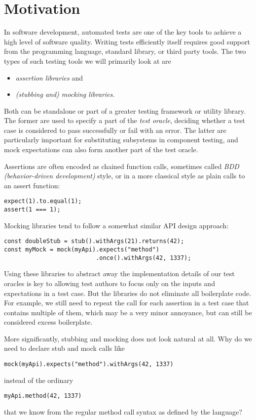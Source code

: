 \section{Motivation}
In software development, automated tests are one of the key tools
to achieve a high level of software quality.
Writing tests efficiently itself requires good support
from the programming language, standard library, or third party tools.
The two types of such testing tools we will primarily look at are
\begin{itemize}
  \item \textit{assertion libraries} and
  \item \textit{(stubbing and) mocking libraries}.
\end{itemize}
Both can be standalone or part of a greater testing framework or utility library.
The former are used to specify a part of the \textit{test oracle},
deciding whether a test case is considered to pass successfully or fail with an error.
The latter are particularly important for substituting subsystems in component testing,
and mock expectations can also form another part of the test oracle.

Assertions are often encoded as chained function calls,
sometimes called \textit{BDD (behavior-driven development)} style,
or in a more classical style as plain calls to an assert function:
\autocite{ChaiBddDoc}\autocite{ChaiTddDoc}
\begin{verbatim}
expect(1).to.equal(1);
assert(1 === 1);
\end{verbatim}
Mocking libraries tend to follow a somewhat similar API design approach:
\autocite{SinonStubDoc}\autocite{SinonMockDoc}
\begin{verbatim}
const doubleStub = stub().withArgs(21).returns(42);
const myMock = mock(myApi).expects("method")
                          .once().withArgs(42, 1337);
\end{verbatim}

Using these libraries to abstract away
the implementation details of our test oracles
is key to allowing test authors to
focus only on the inputs and expectations in a test case.
But the libraries do not eliminate all boilerplate code.
For example, we still need to repeat the  call
for each assertion in a test case that contains multiple of them,
which may be a very minor annoyance,
but can still be considered excess boilerplate.

More significantly, stubbing and mocking does not look natural at all.
Why do we need to declare stub and mock calls like
\begin{verbatim}
mock(myApi).expects("method").withArgs(42, 1337)
\end{verbatim}
instead of the ordinary
\begin{verbatim}
myApi.method(42, 1337)
\end{verbatim}
that we know from the regular method call syntax as defined by the language?

